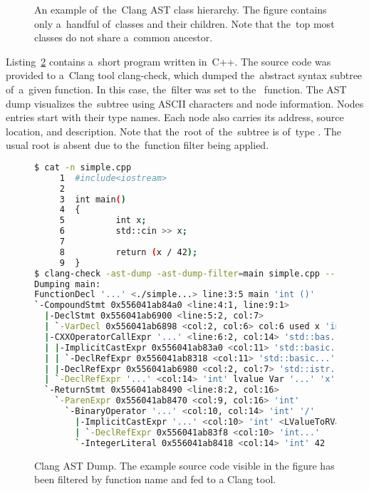 \begin{figure}[ht]
\caption{An example of~the~Clang AST class hierarchy. 
The figure contains only a~handful of~classes and their children.
Note that the~top most classes do not share a~common ancestor.}
\label{dia:ast}
\end{figure}

Listing~\ref{lst:astdump} contains a~short program written in~C++.
The source code was provided to a~Clang tool clang-check, which
dumped the~abstract syntax subtree of~a~given function.
In this case, the~filter was set to the~ function.
The AST dump visualizes the~subtree using ASCII characters
and node information.
Nodes entries start with their type names. 
Each node also carries its address, source location, and description.
Note that the~root of~the~subtree is of~type .
The usual root  is absent due to the~function
filter being applied.

\begin{figure}[ht]\centering
\begin{lstlisting}[language=bash, basicstyle=\small, numbers=none]
$ cat -n simple.cpp
     1  #include<iostream>
     2
     3  int main()
     4  {
     5          int x;
     6          std::cin >> x;
     7
     8          return (x / 42);
     9  } 
$ clang-check -ast-dump -ast-dump-filter=main simple.cpp --
Dumping main:
FunctionDecl '...' <./simple...> line:3:5 main 'int ()'
`-CompoundStmt 0x556041ab84a0 <line:4:1, line:9:1>
  |-DeclStmt 0x556041ab6900 <line:5:2, col:7>
  | `-VarDecl 0x556041ab6898 <col:2, col:6> col:6 used x 'int'
  |-CXXOperatorCallExpr '...' <line:6:2, col:14> 'std::bas...'
  | |-ImplicitCastExpr 0x556041ab83a0 <col:11> 'std::basic...'
  | | `-DeclRefExpr 0x556041ab8318 <col:11> 'std::basic...'
  | |-DeclRefExpr 0x556041ab6980 <col:2, col:7> 'std::istr...'
  | `-DeclRefExpr '...' <col:14> 'int' lvalue Var '...' 'x'
  `-ReturnStmt 0x556041ab8490 <line:8:2, col:16>
    `-ParenExpr 0x556041ab8470 <col:9, col:16> 'int'
      `-BinaryOperator '...' <col:10, col:14> 'int' '/'
        |-ImplicitCastExpr '...' <col:10> 'int' <LValueToRValue>
        | `-DeclRefExpr 0x556041ab83f8 <col:10> 'int...'
        `-IntegerLiteral 0x556041ab8418 <col:14> 'int' 42
\end{lstlisting}
\caption{Clang AST Dump. The example source code visible
in the figure has been filtered by function name and fed
to a Clang tool.}
\label{lst:astdump}
\end{figure}

